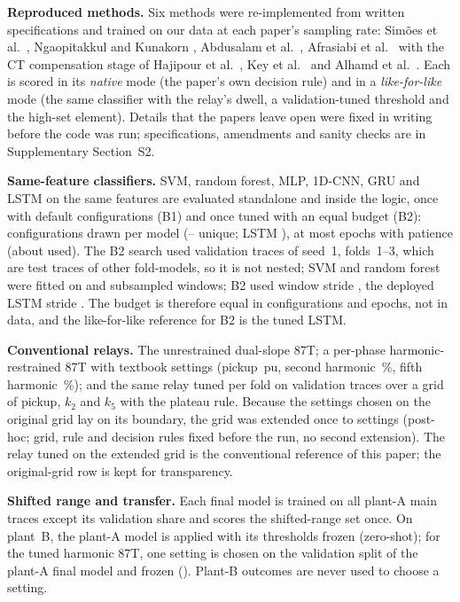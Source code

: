 \documentclass[preprint,12pt]{elsarticle}
\begin{document}
\textbf{Reproduced methods.} Six methods were re-implemented from written specifications and trained on our data at each paper's sampling rate: Sim\~oes et al.\ \citep{simoes2021}, Ngaopitakkul and Kunakorn \citep{ngaopitakkul2006}%
, Abdusalam et al.\ \citep{abdusalam2022}, Afrasiabi et al.\ \citep{afrasiabi2020} with the CT compensation stage of Hajipour et al.\ \citep{hajipour2015}, Key et al.\ \citep{key2025} and Alhamd et al.\ \citep{alhamd2024}. Each is scored in its \emph{native} mode (the paper's own decision rule) and in a \emph{like-for-like} mode (the same classifier with the relay's dwell, a validation-tuned threshold and the high-set element). Details that the papers leave open were fixed in writing before the code was run; specifications, amendments and sanity checks are in Supplementary Section~S2.

\textbf{Same-feature classifiers.} SVM, random forest, MLP, 1D-CNN, GRU and LSTM on the same \nFeat{} features are evaluated standalone and inside the logic, once with default configurations (B1) and once tuned with an equal budget (B2): \drawn{} configurations drawn per model (\uniqLo--\uniqHi{} unique; LSTM \uniqLstm), at most \epochs{} epochs with patience \patience{} (about \epochsUsed{} used). The B2 search used validation traces of seed~1, folds~1--3, which are test traces of other fold-models, so it is not nested; SVM and random forest were fitted on \subSvm{} and \subRf{} subsampled windows; B2 used window stride \strideBtwo{}, the deployed LSTM stride \strideDep. The budget is therefore equal in configurations and epochs, not in data, and the like-for-like reference for B2 is the tuned LSTM.

\textbf{Conventional relays.} The unrestrained dual-slope 87T; a per-phase harmonic-restrained 87T with textbook settings (pickup \pickup\,pu, second harmonic \kTwo\,\%, fifth harmonic \kFive\,\%); and the same relay tuned per fold on validation traces over a grid of pickup, $k_2$ and $k_5$ with the plateau rule. Because the settings chosen on the original grid lay on its boundary, the grid was extended once to \nGridX{} settings (post-hoc; grid, rule and decision rules fixed before the run, no second extension). The relay tuned on the extended grid is the conventional reference of this paper; the original-grid row is kept for transparency.

\textbf{Shifted range and transfer.} Each final model is trained on all plant-A main traces except its validation share and scores the shifted-range set once. On plant~B, the plant-A model is applied with its thresholds frozen (zero-shot); for the tuned harmonic 87T, one setting is chosen on the validation split of the plant-A final model and frozen (\frozenSet). Plant-B outcomes are never used to choose a setting.
\end{document}
